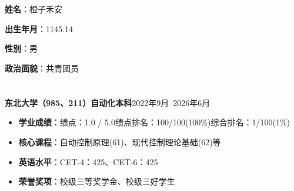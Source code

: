 \documentclass[11pt]{article}
\newlength{\iconwidth}
\begin{document}
	\begin{minipage}[t]{0.78\textwidth}
		\begin{minipage}[t]{\textwidth}
			\section[个人信息]{}
			\begin{minipage}[t]{0.5\textwidth}
				\textbf{姓\qquad 名}：橙子禾安
				
				\vspace{0em}
				\textbf{出生年月}：1145.14
			\end{minipage}
			\begin{minipage}[t]{0.35\textwidth}
				\textbf{性\qquad 别}：男
				
				\vspace{0em}
				\textbf{政治面貌}：共青团员
			\end{minipage}
			\vspace{1.2em}
		\end{minipage}
		
	\end{minipage}
	\hfill
	\vspace{-1.3em}
	\begin{minipage}[t]{\textwidth}
		\section[教育背景]{}
		
		{\textbf{东北大学（985、211）\hfill 自动化\hfill 本科\hfill}2022年9月--2026年6月}
		
		\begin{itemize}
			\item \textbf{学业成绩}：绩点：1.0 / 5.0\qquad 绩点排名：100/100(100\%)\qquad 综合排名：1/100(1\%)
			\item\textbf{核心课程}：自动控制原理(61)、现代控制理论基础(62)等
			\item \textbf{英语水平}：CET-4：425、CET-6：425
			\item \textbf{荣誉奖项}：校级三等奖学金、校级三好学生
		\end{itemize}
	\end{minipage}
	
\end{document}
